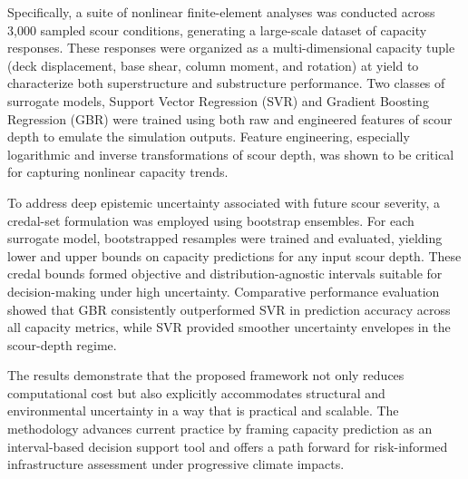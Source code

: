 \documentclass[authoryear,preprint,review,12pt]{elsarticle}
\begin{document}
Specifically, a suite of nonlinear finite-element analyses was conducted across 3,000 sampled scour conditions, generating a large-scale dataset of capacity responses. These responses were organized as a multi-dimensional capacity tuple (deck displacement, base shear, column moment, and rotation) at yield to characterize both superstructure and substructure performance. Two classes of surrogate models, Support Vector Regression (SVR) and Gradient Boosting Regression (GBR) were trained using both raw and engineered features of scour depth to emulate the simulation outputs. Feature engineering, especially logarithmic and inverse transformations of scour depth, was shown to be critical for capturing nonlinear capacity trends.

To address deep epistemic uncertainty associated with future scour severity, a credal-set formulation was employed using bootstrap ensembles. For each surrogate model, bootstrapped resamples were trained and evaluated, yielding lower and upper bounds on capacity predictions for any input scour depth. These credal bounds formed objective and distribution-agnostic intervals suitable for decision-making under high uncertainty. Comparative performance evaluation showed that GBR consistently outperformed SVR in prediction accuracy across all capacity metrics, while SVR provided smoother uncertainty envelopes in the scour-depth regime.

The results demonstrate that the proposed framework not only reduces computational cost but also explicitly accommodates structural and environmental uncertainty in a way that is practical and scalable. The methodology advances current practice by framing capacity prediction as an interval-based decision support tool and offers a path forward for risk-informed infrastructure assessment under progressive climate impacts.


 

\end{document}
